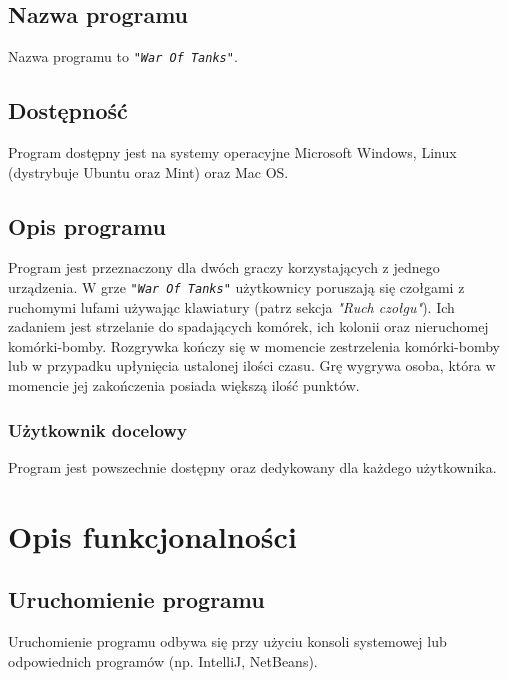 \documentclass[a4paper]{article}
\begin{document}
\subsection{Nazwa programu}
\quad Nazwa programu to \texttt{\textit{"War Of Tanks"}}. 

\subsection{Dost\k{e}pno\'s\'c}
\quad Program dost\k{e}pny jest na systemy operacyjne Microsoft Windows, Linux (dystrybuje Ubuntu oraz Mint) oraz Mac OS.

\subsection{Opis programu}
\quad Program jest przeznaczony dla dw\'och graczy korzystaj\k{a}cych z jednego urz\k{a}dzenia. 
W grze \texttt{\textit{"War Of Tanks"}} u\.zytkownicy poruszaj\k{a} si\k{e} czo\l{}gami z ruchomymi lufami u\.zywaj\k{a}c klawiatury (patrz sekcja \textit{"Ruch czo\l{}gu"}).
Ich zadaniem jest strzelanie do spadaj\k{a}cych kom\'orek, ich kolonii oraz nieruchomej kom\'orki-bomby.
Rozgrywka ko\'nczy si\k{e} w momencie zestrzelenia kom\'orki-bomby lub w przypadku up\l{}yni\k{e}cia ustalonej ilo\'sci czasu.
Gr\k{e} wygrywa osoba, kt\'ora w momencie jej zako\'nczenia posiada wi\k{e}ksz\k{a} ilo\'s\'c punkt\'ow.

\subsubsection{U\.zytkownik docelowy}
\quad Program jest powszechnie dost\k{e}pny oraz dedykowany dla ka\.zdego u\.zytkownika.








\section{Opis funkcjonalno\'sci}


\subsection{Uruchomienie programu}
\quad Uruchomienie programu odbywa si\k{e} przy u\.zyciu konsoli systemowej lub odpowiednich program\'ow (np. IntelliJ, NetBeans).
\end{document}
